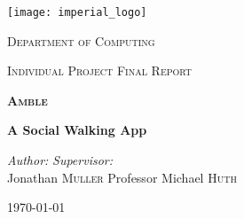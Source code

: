 \begin{titlepage}
    \begin{center}
        \vspace*{2cm}
        \texttt{[image: imperial\_logo]}
        \vspace{2cm}
        
        \LARGE
        \textsc{Department of Computing}
        
        \textsc{Individual Project Final Report}
        
        \vspace{2cm}
        \vhrulefill{2pt}
        \vspace{0.2cm}
        
        \huge
        \textbf{\textsc{Amble}}
        
        \vspace{0.2cm}
        
        \LARGE
        \textbf{A Social Walking App}
        
        \vspace{0.2cm}
        \vhrulefill{2pt}
        \vspace{2cm}
        
        \begin{flushleft}
            \Large
            \textit{Author:}
            \hfill
            \textit{Supervisor:}\\
            Jonathan \textsc{Muller}
            \hfill
            Professor Michael \textsc{Huth}\\
        \end{flushleft}
        
        \vfill
        \Large
        \today
    \end{center}
\end{titlepage}